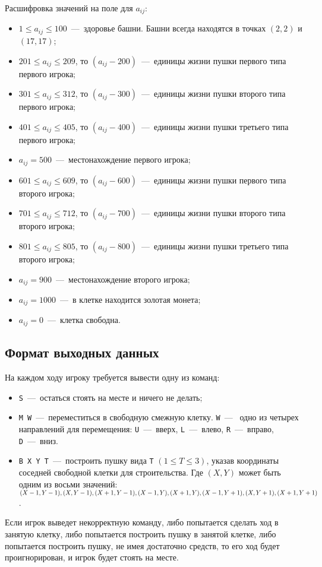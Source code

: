 Расшифровка значений на поле для $a_{ij}$:
\begin{itemize}
    \item $1 \leq a_{ij} \leq 100$~---~здоровье башни. Башни всегда находятся в точках $(2, 2)$ и $(17, 17)$;
    \item $201 \leq a_{ij} \leq 209$, то $(a_{ij} - 200)$~---~единицы жизни пушки первого типа первого игрока;
    \item $301 \leq a_{ij} \leq 312$, то $(a_{ij} - 300)$~---~единицы жизни пушки второго типа первого игрока;
    \item $401 \leq a_{ij} \leq 405$, то $(a_{ij} - 400)$~---~единицы жизни пушки третьего типа первого игрока;
    \item $a_{ij} = 500$~---~местонахождение первого игрока;
    \item $601 \leq a_{ij} \leq 609$, то $(a_{ij} - 600)$~---~единицы жизни пушки первого типа второго игрока;
    \item $701 \leq a_{ij} \leq 712$, то $(a_{ij} - 700)$~---~единицы жизни пушки второго типа второго игрока;
    \item $801 \leq a_{ij} \leq 805$, то $(a_{ij} - 800)$~---~единицы жизни пушки третьего типа второго игрока;
    \item $a_{ij} = 900$~---~местонахождение второго игрока;
    \item $a_{ij} = 1000$~---~в клетке находится золотая монета;
    \item $a_{ij} = 0$~---~клетка свободна.
\end{itemize} 

\subsection*{Формат выходных данных}
На каждом ходу игроку требуется вывести одну из команд:
\begin{itemize}
    \item \texttt{S}~---~остаться стоять на месте и ничего не делать;
    \item \texttt{M W}~---~переместиться в свободную смежную клетку. \texttt{W}~---~ одно из четырех направлений для перемещения: \texttt{U}~---~вверх, \texttt{L}~---~влево, \texttt{R}~---~вправо, \texttt{D}~---~вниз.
    \item \texttt{B X Y T}~---~построить пушку вида \texttt{T} $(1 \leq T \leq 3)$, указав координаты соседней свободной клетки для строительства. Где $(X, Y)$ может быть одним из восьми значений: $(X - 1, Y - 1), (X, Y - 1), (X + 1, Y - 1), (X - 1, Y), \\ (X + 1, Y), (X - 1, Y + 1), (X, Y + 1), (X + 1, Y + 1)$.
\end{itemize}

Если игрок выведет некорректную команду, либо попытается сделать ход в занятую клетку, либо попытается построить пушку в занятой клетке, либо попытается построить пушку, не имея достаточно средств, то его ход будет проигнорирован, и игрок будет стоять на месте. 